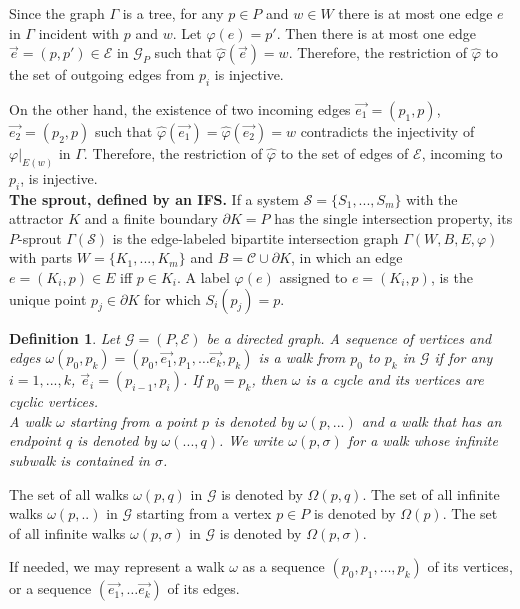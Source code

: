 \documentclass[11pt,reqno]{amsart}
\newtheorem{definition}[theorem]{Definition}
\newcommand{\eS}{{\mathcal S}}
\begin{document}
Since the graph $\Gamma$ is a tree, for any $p\in P$ and $w\in W$ there is at most one edge $e$ in $\Gamma$ incident with $p$ and $w$. Let $\varphi(e)=p'$. 
Then there is at most one edge $\vec e=(p,p')\in{{\mathcal E}}$ in ${{\mathcal G}}_P$ such that $\hat\varphi(\vec e)=w.$
Therefore, the  restriction of $\hat\varphi$ to the set of outgoing edges from  $p_i$ is injective.

On the other hand, the existence of two incoming edges $\vec {e_1}=(p_1,p)$,  $\vec {e_2}=(p_2,p)$ such that $\hat\varphi(\vec {e_1})=\hat\varphi(\vec {e_2})=w$ contradicts the injectivity of $\varphi|_{E(w)}$ in $\Gamma$. 
Therefore, the  restriction of $\hat\varphi$ to the set of edges of ${{\mathcal E}}$,  incoming  to  $p_i$, is injective.\\

{\bf The sprout, defined by an IFS.} If a system ${\eS}=\{S_1,...,S_m\}$ with the attractor $K$ and a finite boundary $\partial K=P$ has the single intersection property, its $P$-sprout $\Gamma({\eS})$ is the edge-labeled bipartite intersection graph $\Gamma(W, B, E,\varphi)$ with parts $W=\{K_1,...,K_m \}$ and $B={\mathcal C}\cup \partial K$, in which an edge $ e = (K_i, p ) \in E$ 
iff $p \in K_i$. 
A label $\varphi(e)$ assigned to  $e=(K_i,p)$, is the unique point $p_j \in {\partial} K$ for which $S_i(p_j)=p$. 

\begin{definition}\label{walks}
Let ${{\mathcal G}} =(P,{{\mathcal E}})$ be a   directed graph. A sequence of vertices and edges $\omega(p_0,p_k)=(p_0,\vec{e_1},p_1,\hdots \vec{e_k},p_k)$ is {\em a walk from $p_0$ to $ p_k$ } in ${{\mathcal G}}$ if  for any $i=1,...,k$,  $\vec e_i=(p_{i-1},p_i)$. 
If $p_0=p_k$, then $\omega$ is a {\em cycle} and its vertices are {\em cyclic vertices}.\\
A walk $\omega$ starting from a point $p$ is denoted by $\omega(p,...)$ and a walk that has an endpoint $q$ is denoted by $\omega(...,q)$.
We write $\omega(p,\sigma)$ for a walk whose infinite subwalk is contained in $\sigma$.
\end{definition}

The set of all   walks $\omega(p,q)$ in ${{\mathcal G}}$  is denoted by $\Omega(p,q)$. 
The set of all infinite walks $\omega(p,..)$ in  ${{\mathcal G}}$ starting from a vertex $p\in P$ is denoted by $\Omega(p)$. 
The set of all infinite walks $\omega(p,\sigma)$ in  ${{\mathcal G}} $ is denoted by $\Omega(p,\sigma)$.

If needed, we may represent a walk $\omega$ as a sequence  $(p_0,p_1,\hdots, p_k)$ of its vertices, or a 
sequence $( \vec{e_1},\hdots \vec{e_k})$  of its edges. \\
\end{document}
